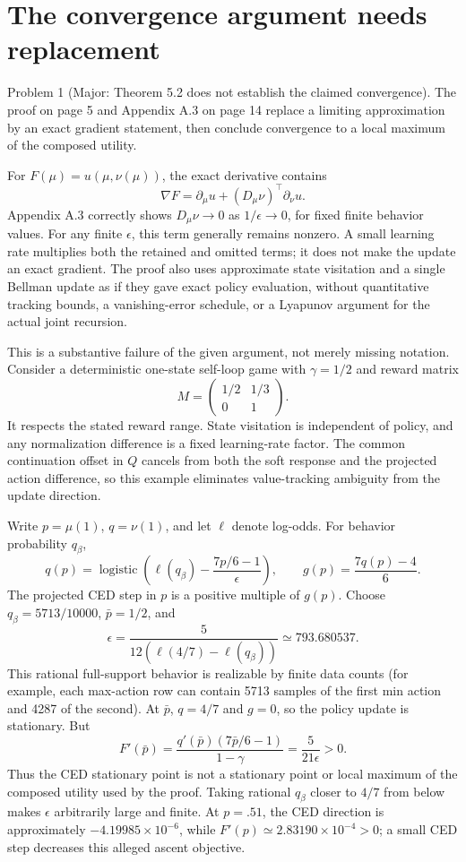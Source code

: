 \documentclass[10pt]{article}
\begin{document}
\section*{The convergence argument needs replacement}
Problem 1 (Major: Theorem 5.2 does not establish the claimed convergence).  The proof on page 5 and Appendix A.3 on page 14 replace a limiting approximation by an exact gradient statement, then conclude convergence to a local maximum of the composed utility.\par
For \(F(\mu)=u(\mu,\nu(\mu))\), the exact derivative contains \[\nabla F=\partial_\mu u+(D_\mu\nu)^\top\partial_\nu u.\] Appendix A.3 correctly shows \(D_\mu\nu\to0\) as \(1/\epsilon\to0\), for fixed finite behavior values. For any finite \(\epsilon\), this term generally remains nonzero. A small learning rate multiplies both the retained and omitted terms; it does not make the update an exact gradient. The proof also uses approximate state visitation and a single Bellman update as if they gave exact policy evaluation, without quantitative tracking bounds, a vanishing-error schedule, or a Lyapunov argument for the actual joint recursion.\par
This is a substantive failure of the given argument, not merely missing notation. Consider a deterministic one-state self-loop game with \(\gamma=1/2\) and reward matrix \[M=\begin{pmatrix}1/2&1/3\\0&1\end{pmatrix}.\] It respects the stated reward range. State visitation is independent of policy, and any normalization difference is a fixed learning-rate factor. The common continuation offset in \(Q\) cancels from both the soft response and the projected action difference, so this example eliminates value-tracking ambiguity from the update direction.\par
Write \(p=\mu(1)\), \(q=\nu(1)\), and let \(\ell\) denote log-odds. For behavior probability \(q_\beta\), \[q(p)=\operatorname{logistic}\!\left(\ell(q_\beta)-\frac{7p/6-1}{\epsilon}\right),\qquad
 g(p)=\frac{7q(p)-4}{6}.\] The projected CED step in \(p\) is a positive multiple of \(g(p)\). Choose \(q_\beta=5713/10000\), \(\bar p=1/2\), and \[\epsilon=\frac{5}{12(\ell(4/7)-\ell(q_\beta))}\simeq793.680537.\] This rational full-support behavior is realizable by finite data counts (for example, each max-action row can contain 5713 samples of the first min action and 4287 of the second). At \(\bar p\), \(q=4/7\) and \(g=0\), so the policy update is stationary. But \[F'(\bar p)=\frac{q'(\bar p)(7\bar p/6-1)}{1-\gamma}
             =\frac{5}{21\epsilon}>0.\] Thus the CED stationary point is not a stationary point or local maximum of the composed utility used by the proof. Taking rational \(q_\beta\) closer to \(4/7\) from below makes \(\epsilon\) arbitrarily large and finite. At \(p=.51\), the CED direction is approximately \(-4.19985\times10^{-6}\), while \(F'(p)\simeq2.83190\times10^{-4}>0\); a small CED step decreases this alleged ascent objective.\par
\end{document}
